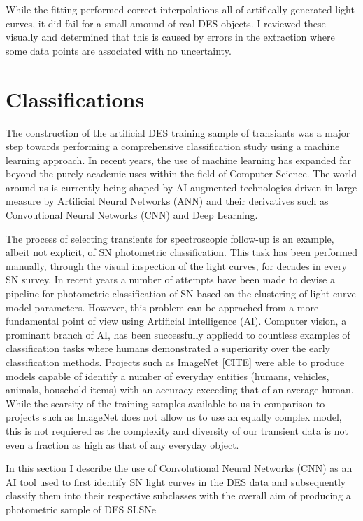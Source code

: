 While the fitting performed correct interpolations all of artifically generated light curves, it did fail for a small amound of real DES objects. I reviewed these visually and determined that this is caused by errors in the extraction where some data points are associated with no uncertainty.

\section{Classifications} \label{sec:CNN}
The construction of the artificial DES training sample of transiants was a major step towards performing a comprehensive classification study using a machine learning approach. In recent years, the use of machine learning has expanded far beyond the purely academic uses within the field of Computer Science. The world around us is currently being shaped by AI augmented technologies driven in large measure by Artificial Neural Networks (ANN) and their derivatives such as Convoutional Neural Networks (CNN) and Deep Learning.

The process of selecting transients for spectroscopic follow-up is an example, albeit not explicit, of SN photometric classification. This task has been performed manually, through the visual inspection of the light curves, for decades in every SN survey. In recent years a number of attempts have been made to devise a pipeline for photometric classification of SN based on the clustering of light curve model parameters. However, this problem can be apprached from a more fundamental point of view using Artificial Intelligence (AI). Computer vision, a prominant branch of AI, has been successfully appliedd to countless examples of classification tasks where humans demonstrated a superiority over the early classification methods. Projects such as ImageNet [CITE] were able to produce models capable of identify a number of everyday entities (humans, vehicles, animals, household items) with an accuracy exceeding that of an average human. While the scarsity of the training samples available to us in comparison to projects such as ImageNet does not allow us to use an equally complex model, this is not requiered as the complexity and diversity of our transient data is not even a fraction as high as that of any everyday object.

In this section I describe the use of Convolutional Neural Networks (CNN) as an AI tool used to first identify SN light curves in the DES data and subsequently classify them into their respective subclasses with the overall aim of producing a photometric sample of DES SLSNe

